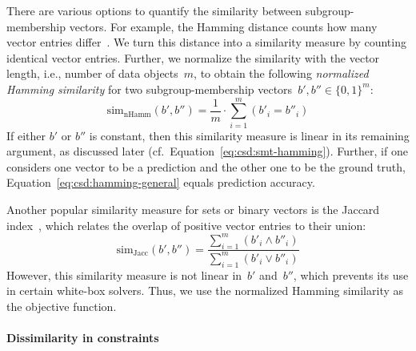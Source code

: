 \documentclass{article}
\theoremstyle{definition}
\begin{document}
There are various options to quantify the similarity between subgroup-membership vectors.
For example, the Hamming distance counts how many vector entries differ~\cite{choi2010survey}.
We turn this distance into a similarity measure by counting identical vector entries.
Further, we normalize the similarity with the vector length, i.e., number of data objects~$m$, to obtain the following \emph{normalized Hamming similarity} for two subgroup-membership vectors~$b', b'' \in \{0, 1\}^m$:
%
\begin{equation}
	\text{sim}_{\text{nHamm}}(b', b'') = \frac{1}{m} \cdot \sum_{i=1}^{m} (b'_i = b''_i)
	\label{eq:csd:hamming-general}
\end{equation}
%
If either $b'$ or $b''$ is constant, then this similarity measure is linear in its remaining argument, as discussed later (cf.~Equation~\ref{eq:csd:smt-hamming}).
Further, if one considers one vector to be a prediction and the other one to be the ground truth, Equation~\ref{eq:csd:hamming-general} equals prediction accuracy.

Another popular similarity measure for sets or binary vectors is the Jaccard index~\cite{choi2010survey}, which relates the overlap of positive vector entries to their union:
%
\begin{equation}
	\text{sim}_{\text{Jacc}}(b', b'') = \frac{\sum_{i=1}^{m} (b'_i \land b''_i)}{\sum_{i=1}^{m} (b'_i \lor b''_i)}
	\label{eq:csd:jaccard}
\end{equation}
%
However, this similarity measure is not linear in~$b'$ and~$b''$, which prevents its use in certain white-box solvers.
Thus, we use the normalized Hamming similarity as the objective function.

\paragraph{Dissimilarity in constraints}
\end{document}
